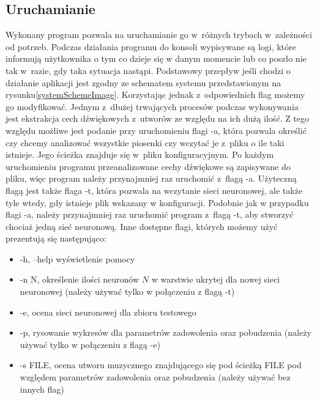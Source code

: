 \begin{appendices}
\subsection{Uruchamianie}
Wykonany program pozwala na uruchamianie go w~różnych trybach w~zależności od potrzeb. Podczas działania programu do konsoli wypisywane są logi, które informują użytkownika o tym co dzieje się w danym momencie lub co poszło nie tak w~razie, gdy taka sytuacja nastąpi. Podstawowy przepływ jeśli chodzi o działanie aplikacji jest zgodny ze schematem systemu przedstawionym na rysunku\ref{systemSchemeImage}. Korzystając jednak z~odpowiednich flag możemy go modyfikować. Jednym z~dłużej trwających procesów podczas wykonywania jest ekstrakcja cech dźwiękowych z~utworów ze względu na ich dużą ilość. Z tego względu możliwe jest podanie przy uruchomieniu flagi -a, która pozwala określić czy chcemy analizować wszystkie piosenki czy wczytać je z~pliku o ile taki istnieje. Jego ścieżka znajduje się w~pliku konfiguracyjnym. Po każdym uruchomieniu programu przeanalizowane cechy dźwiękowe są zapisywane do pliku, więc program należy przynajmniej raz uruchomić z~flagą -a. Użyteczną flagą jest także flaga -t, która pozwala na wczytanie sieci neuronowej, ale także tyle wtedy, gdy istnieje plik wskazany w konfiguracji. Podobnie jak w przypadku flagi -a, należy przynajmniej raz uruchomić program z~flagą -t, aby stworzyć chociaż jedną sieć neuronową.
Inne dostępne flagi, których możemy użyć prezentują się następująco:
\begin{itemize}
\item -h, --help wyświetlenie pomocy
\item -n N, określenie ilości neuronów $N$ w warstwie ukrytej dla nowej sieci neuronowej (należy używać tylko w połączeniu z flagą -t)
\item -e, ocena sieci neuronowej dla zbioru testowego
\item -p, rysowanie wykresów dla parametrów zadowolenia oraz pobudzenia (należy używać tylko w połączeniu z flagą -e)
\item -s FILE, ocena utworu muzycznego znajdującego się pod ścieżką FILE pod względem parametrów zadowolenia oraz pobudzenia (należy używać bez innych flag)
\end{itemize}
\end{appendices}


